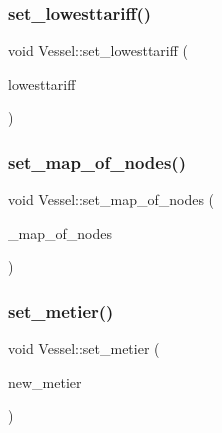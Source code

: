 \mbox{\label{class_vessel_a709b8079213a035edbfffc0b1627ef91}} 
\subsubsection{\texorpdfstring{set\_lowesttariff()}{set\_lowesttariff()}}
{\footnotesize\ttfamily void Vessel\+::set\+\_\+lowesttariff (\begin{DoxyParamCaption}\item[{\mbox{\hyperlink{classtypes_1_1_node_id}{types\+::\+Node\+Id}}}]{lowesttariff }\end{DoxyParamCaption})}

\mbox{\label{class_vessel_aca8d7c0707ac3c5ee73f55ffab536af3}} 
\subsubsection{\texorpdfstring{set\_map\_of\_nodes()}{set\_map\_of\_nodes()}}
{\footnotesize\ttfamily void Vessel\+::set\+\_\+map\+\_\+of\+\_\+nodes (\begin{DoxyParamCaption}\item[{const vector$<$ \mbox{\hyperlink{class_node}{Node}} $\ast$ $>$ \&}]{\+\_\+map\+\_\+of\+\_\+nodes }\end{DoxyParamCaption})}

\mbox{\label{class_vessel_a364b8fd263a586fd5271188fda037b52}} 
\subsubsection{\texorpdfstring{set\_metier()}{set\_metier()}}
{\footnotesize\ttfamily void Vessel\+::set\+\_\+metier (\begin{DoxyParamCaption}\item[{\mbox{\hyperlink{class_metier}{Metier}} $\ast$}]{new\+\_\+metier }\end{DoxyParamCaption})}

\mbox{\label{class_vessel_a24c6275217ad49bf868e700773c536a1}} 
